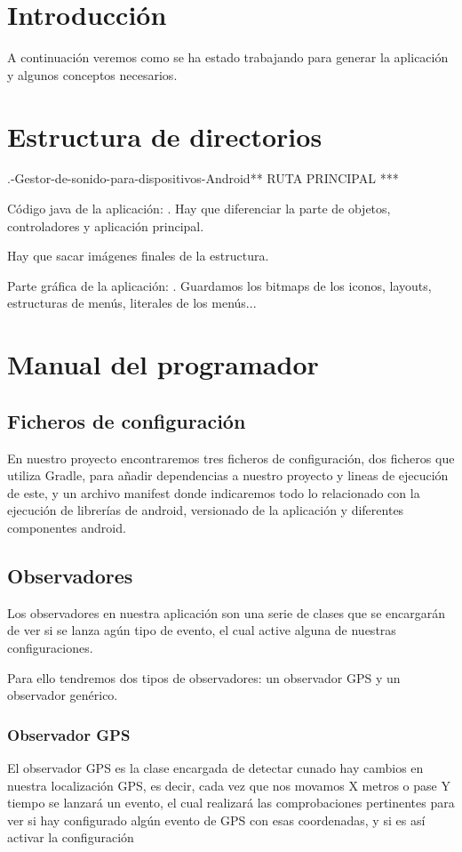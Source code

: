 
\section{Introducción}
A continuación veremos como se ha estado trabajando para generar la aplicación y algunos conceptos necesarios.
\section{Estructura de directorios}
.\TFG-Gestor-de-sonido-para-dispositivos-Android\Codigo\app\src\main *** RUTA PRINCIPAL ***

Código java de la aplicación:
.\java
Hay que diferenciar la parte de objetos, controladores y aplicación principal.

Hay que sacar imágenes finales de la estructura.

Parte gráfica de la aplicación:
.\res
Guardamos los bitmaps de los iconos, layouts, estructuras de menús, literales de los menús...

\section{Manual del programador}
\subsection{Ficheros de configuración}
En nuestro proyecto encontraremos tres ficheros de configuración, dos ficheros que utiliza Gradle, para añadir dependencias a nuestro proyecto y lineas de ejecución de este, y un archivo manifest donde indicaremos todo lo relacionado con la ejecución de librerías de android, versionado de la aplicación y diferentes componentes android.
\subsection{Observadores}
Los observadores en nuestra aplicación son una serie de clases que se encargarán de ver si se lanza agún tipo de evento, el cual active alguna de nuestras configuraciones.

Para ello tendremos dos tipos de observadores: un observador GPS y un observador genérico.
\subsubsection{Observador GPS}
El observador GPS es la clase encargada de detectar cunado hay cambios en nuestra localización GPS, es decir, cada vez que nos movamos X metros o pase Y tiempo se lanzará un evento, el cual realizará las comprobaciones pertinentes para ver si hay configurado algún evento de GPS con esas coordenadas, y si es así activar la configuración 

